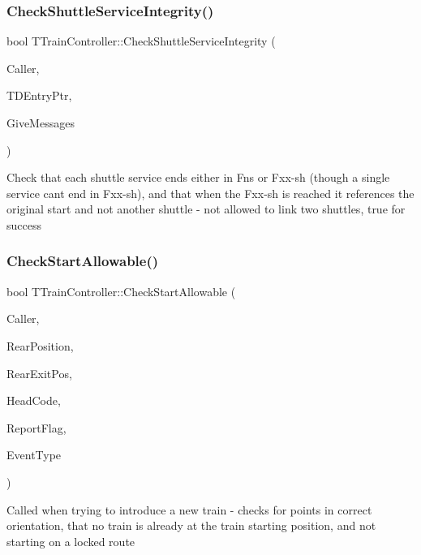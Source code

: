 \subsubsection{\texorpdfstring{Check\+Shuttle\+Service\+Integrity()}{CheckShuttleServiceIntegrity()}}
{\footnotesize\ttfamily bool T\+Train\+Controller\+::\+Check\+Shuttle\+Service\+Integrity (\begin{DoxyParamCaption}\item[{int}]{Caller,  }\item[{\mbox{\hyperlink{class_t_train_data_entry}{T\+Train\+Data\+Entry}} $\ast$}]{T\+D\+Entry\+Ptr,  }\item[{bool}]{Give\+Messages }\end{DoxyParamCaption})}

Check that each shuttle service ends either in Fns or Fxx-\/sh (though a single service can\textquotesingle{}t end in Fxx-\/sh), and that when the Fxx-\/sh is reached it references the original start and not another shuttle -\/ not allowed to link two shuttles, true for success \mbox{\label{class_t_train_controller_ab8d8cf015d4784f12585f0ead325e9bf}} 
\subsubsection{\texorpdfstring{Check\+Start\+Allowable()}{CheckStartAllowable()}}
{\footnotesize\ttfamily bool T\+Train\+Controller\+::\+Check\+Start\+Allowable (\begin{DoxyParamCaption}\item[{int}]{Caller,  }\item[{int}]{Rear\+Position,  }\item[{int}]{Rear\+Exit\+Pos,  }\item[{Ansi\+String}]{Head\+Code,  }\item[{bool}]{Report\+Flag,  }\item[{T\+Action\+Event\+Type \&}]{Event\+Type }\end{DoxyParamCaption})}

Called when trying to introduce a new train -\/ checks for points in correct orientation, that no train is already at the train starting position, and not starting on a locked route \mbox{\label{class_t_train_controller_a523077cf0c9c02c8cb56dab0af9b0e52}} 
